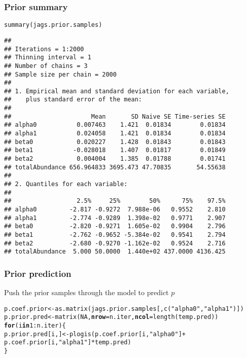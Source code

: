\documentclass[color=usenames,dvipsnames]{beamer}\usepackage[]{graphicx}\usepackage[]{xcolor}
\makeatletter
\newcommand{\hlnum}[1]{\textcolor[rgb]{0.69,0.494,0}{#1}}%
\newcommand{\hlsng}[1]{\textcolor[rgb]{0.749,0.012,0.012}{#1}}%
\newcommand{\hlopt}[1]{\textcolor[rgb]{0,0,0}{#1}}%
\newcommand{\hldef}[1]{\textcolor[rgb]{0,0,0}{#1}}%
\newcommand{\hlkwa}[1]{\textcolor[rgb]{0,0,0}{\textbf{#1}}}%
\newcommand{\hlkwb}[1]{\textcolor[rgb]{0,0.341,0.682}{#1}}%
\newcommand{\hlkwc}[1]{\textcolor[rgb]{0,0,0}{\textbf{#1}}}%
\newcommand{\hlkwd}[1]{\textcolor[rgb]{0.004,0.004,0.506}{#1}}%
\newenvironment{kframe}{%
 \def\at@end@of@kframe{}%
 \ifinner\ifhmode%
  \def\at@end@of@kframe{\end{minipage}}%
  \begin{minipage}{\columnwidth}%
 \fi\fi%
 \def\FrameCommand##1{\hskip\@totalleftmargin \hskip-\fboxsep
 \colorbox{shadecolor}{##1}\hskip-\fboxsep
     \hskip-\linewidth \hskip-\@totalleftmargin \hskip\columnwidth}%
 \MakeFramed {\advance\hsize-\width
   \@totalleftmargin\z@ \linewidth\hsize
   \@setminipage}}%
 {\par\unskip\endMakeFramed%
 \at@end@of@kframe}
\newenvironment{knitrout}{}{} %
\makeatother
\begin{document}
\begin{frame}[fragile]
  \frametitle{Prior summary}
\begin{knitrout}\tiny
{}\color{fgcolor}\begin{kframe}
\begin{alltt}
\hlkwd{summary}\hldef{(jags.prior.samples)}
\end{alltt}
\begin{verbatim}
## 
## Iterations = 1:2000
## Thinning interval = 1 
## Number of chains = 3 
## Sample size per chain = 2000 
## 
## 1. Empirical mean and standard deviation for each variable,
##    plus standard error of the mean:
## 
##                      Mean       SD Naive SE Time-series SE
## alpha0           0.007463    1.421  0.01834        0.01834
## alpha1           0.024058    1.421  0.01834        0.01834
## beta0            0.020227    1.428  0.01843        0.01843
## beta1           -0.028018    1.407  0.01817        0.01849
## beta2            0.004004    1.385  0.01788        0.01741
## totalAbundance 656.964833 3695.473 47.70835       54.55638
## 
## 2. Quantiles for each variable:
## 
##                  2.5%     25%        50%      75%    97.5%
## alpha0         -2.817 -0.9272  7.988e-06   0.9552    2.810
## alpha1         -2.774 -0.9289  1.398e-02   0.9771    2.907
## beta0          -2.820 -0.9271  1.605e-02   0.9904    2.796
## beta1          -2.762 -0.9652 -5.384e-02   0.9541    2.794
## beta2          -2.680 -0.9270 -1.162e-02   0.9524    2.716
## totalAbundance  5.000 50.0000  1.440e+02 437.0000 4136.425
\end{verbatim}
\end{kframe}
\end{knitrout}
\end{frame}






\begin{frame}[fragile]
  \frametitle{Prior prediction}
  \small
  Push the prior samples through the model to predict $p$
\begin{knitrout}\scriptsize
{}\color{fgcolor}\begin{kframe}
\begin{alltt}
\hldef{p.coef.prior} \hlkwb{<-} \hlkwd{as.matrix}\hldef{(jags.prior.samples[,}\hlkwd{c}\hldef{(}\hlsng{"alpha0"}\hldef{,}\hlsng{"alpha1"}\hldef{)])}
\hldef{p.prior.pred} \hlkwb{<-} \hlkwd{matrix}\hldef{(}\hlnum{NA}\hldef{,} \hlkwc{nrow}\hldef{=n.iter,} \hlkwc{ncol}\hldef{=}\hlkwd{length}\hldef{(temp.pred))}
\hlkwa{for}\hldef{(i} \hlkwa{in} \hlnum{1}\hlopt{:}\hldef{n.iter) \{}
    \hldef{p.prior.pred[i,]} \hlkwb{<-} \hlkwd{plogis}\hldef{(p.coef.prior[i,}\hlsng{"alpha0"}\hldef{]} \hlopt{+}
                               \hldef{p.coef.prior[i,}\hlsng{"alpha1"}\hldef{]}\hlopt{*}\hldef{temp.pred)}
\hldef{\}}
\end{alltt}
\end{kframe}
\end{knitrout}
\end{frame}
\end{document}
